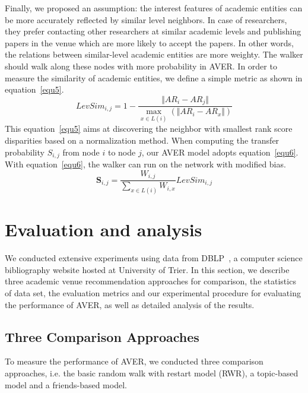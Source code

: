 \documentclass[9pt]{acm_proc_article-sp}
\begin{document}
Finally, we proposed an assumption: the interest features of academic entities can be more accurately reflected by similar level neighbors. In case of researchers, they prefer contacting other researchers at similar academic levels and publishing papers in the venue which are more likely to accept the papers. In other words, the relations between similar-level academic entities are more weighty. The walker should walk along these nodes with more probability in AVER. In order to measure the similarity of academic entities, we define a simple metric as shown in equation~\ref{equ5}.
\begin{equation}
\label{equ5}
LevSim_{i,j}=1-\frac{\Vert AR_{i}-AR_{j}\Vert}{\max_{x\in L(i)}(\Vert AR_{i}-AR_{x}\Vert)}
\end{equation}
This equation~\ref{equ5} aims at discovering the neighbor with smallest rank score disparities based on a normalization method. When computing the transfer probability $S_{i,j}$ from node $i$ to node $j$, our AVER model adopts equation~\ref{equ6}. With equation~\ref{equ6}, the walker can run on the network with modified bias.
\begin{equation}
\label{equ6}
\mathbf{S}_{i,j}=\frac{W_{i,j}}{\sum_{x\in L(i)}W_{i,x}}LevSim_{i,j}
\end{equation}

\section{Evaluation and analysis}
\label{section:evaluation}
We conducted extensive experiments using data from DBLP~\cite{Ley:DBLP}, a computer science bibliography website hosted at University of Trier. In this section, we describe three academic venue recommendation approaches for comparison, the statistics of data set, the evaluation metrics and our experimental procedure for evaluating the performance of AVER, as well as detailed analysis of the results.

\subsection{Three Comparison Approaches}
To measure the performance of AVER, we conducted three comparison approaches, i.e. the basic random walk with restart model (RWR), a topic-based model and a friends-based model.
\end{document}
